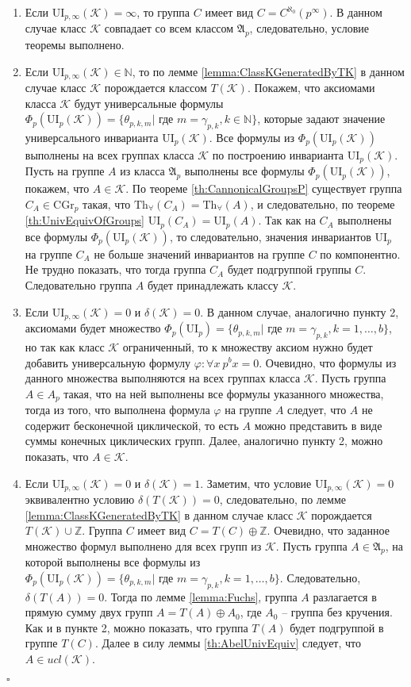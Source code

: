 \documentclass[a4paper,11pt,twoside]{article}
\def\A{{\mathfrak{A}}}
\def\K{{\mathcal{K}}}
\def\Z{{\mathbb{Z}}}
\def\N{{\mathbb{N}}}
\def\Tha{{\mathrm{Th}_\forall}}
\def\CG{{\mathrm{CGr}}}
\def\ui{{\mathrm{UI}}}
\begin{document}
\begin{enumerate}
\item Если $\ui_{p,\infty}(\K) = \infty$, то группа $C$ имеет вид $C = C^{\aleph_0}(p^\infty)$. В данном случае класс $\K$ совпадает со всем классом $\A_p$, следовательно, условие теоремы выполнено.

\item Если $\ui_{p, \infty}(\K) \in \N$, то по лемме \ref{lemma:ClassKGeneratedByTK} в данном случае класс $\K$ порождается классом $T(\K)$. Покажем, что аксиомами класса $\K$ будут универсальные формулы $\Phi_p(\ui_p(\K)) = \{\theta_{p,k,m} | \text{ где } m = \gamma_{p,k}, k \in \N\}$, которые задают значение универсального инварианта $\ui_p(\K).$ Все формулы из $\Phi_p(\ui_p(\K))$ выполнены на всех группах класса $\K$ по построению инварианта $\ui_p(\K)$. Пусть на группе $A$ из класса $\A_p$ выполнены все формулы $\Phi_p(\ui_p(\K))$, покажем, что $A \in \K$. По теореме \ref{th:CannonicalGroupsP} существует группа $C_A \in \CG_p$ такая, что $\Tha(C_A) = \Tha(A)$, и следовательно, по теореме \ref{th:UnivEquivOfGroups} $\ui_p(C_A) = \ui_p(A).$ Так как на $C_A$ выполнены все формулы $\Phi_p(\ui_p(\K))$, то следовательно, значения инвариантов $\ui_p$ на группе $C_A$ не больше значений инвариантов на группе $C$ по компонентно. Не трудно показать, что тогда группа $C_A$ будет подгруппой группы $C$. Следовательно группа $A$ будет принадлежать классу $\K$.

\item Если $\ui_{p, \infty}(\K) = 0$ и $\delta(\K) = 0$. В данном случае, аналогично пункту 2, аксиомами будет множество $\Phi_p(\ui_p) = \{\theta_{p,k,m} | \text{ где } m = \gamma_{p,k}, k = 1,\ldots,b\}$, но так как класс $\K$ ограниченный, то к множеству аксиом нужно будет добавить универсальную формулу $\varphi: \forall x \ p^b x = 0$. Очевидно, что формулы из данного множества выполняются на всех группах класса $\K$. Пусть группа $A \in A_p$ такая, что на ней выполнены все формулы указанного множества, тогда из того, что выполнена формула $\varphi$ на группе $A$ следует, что $A$ не содержит бесконечной циклической, то есть $A$ можно представить в виде суммы конечных циклических групп. Далее, аналогично пункту 2, можно показать, что $A \in \K$.

\item Если $\ui_{p, \infty}(\K) = 0$ и $\delta(\K) = 1$. Заметим, что условие $\ui_{p, \infty}(\K) = 0$ эквивалентно условию $\delta(T(\K)) = 0$, следовательно, по лемме \ref{lemma:ClassKGeneratedByTK} в данном случае класс $\K$ порождается $T(\K) \cup \Z$. Группа $C$ имеет вид $C = T(C) \oplus \Z$. Очевидно, что заданное множество формул выполнено для всех групп из $\K$. Пусть группа $A \in \A_p$, на которой выполнены все формулы из $\Phi_p(\ui_p(\K)) = \{\theta_{p,k,m} | \text{ где } m = \gamma_{p,k}, k = 1, \ldots, b\}.$ Следовательно, $\delta(T(A)) = 0$. Тогда по лемме \ref{lemma:Fuchs}, группа $A$ разлагается в прямую сумму двух групп $A = T(A) \oplus A_0$, где $A_0$ -- группа без кручения. Как и в пункте 2, можно показать, что группа $T(A)$ будет подгруппой в группе $T(C)$. Далее в силу леммы \ref{th:AbelUnivEquiv} следует, что $A \in ucl(\K)$.
\end{enumerate} 
$\square$
\end{document}
